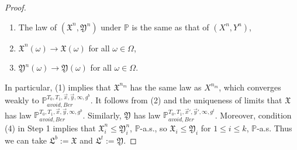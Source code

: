 \begin{proof}
\begin{enumerate}[label=(\arabic*)]
		\item The law of $(\mathfrak{X}^n,\mathfrak{Y}^n)$ under $\mathbb{P}$ is the same as that of $(X^n,Y^n)$,
		
		\item $\mathfrak{X}^n(\omega) \longrightarrow \mathfrak{X}(\omega)$ for all $\omega\in\Omega$,
		
		\item $\mathfrak{Y}^n(\omega) \longrightarrow \mathfrak{Y}(\omega)$ for all $\omega\in\Omega$.
		
	\end{enumerate}
	
	In particular, (1) implies that $\mathfrak{X}^{n_m}$ has the same law as $X^{n_m}$, which converges weakly to $\mathbb{P}_{avoid,Ber}^{T_0,T_1,\vec{x},\vec{y},\infty,g^b}$. It follows from (2) and the uniqueness of limits that $\mathfrak{X}$ has law $\mathbb{P}_{avoid,Ber}^{T_0,T_1,\vec{x},\vec{y},\infty,g^b}$. Similarly, $\mathfrak{Y}$ has law $\mathbb{P}_{avoid,Ber}^{T_0,T_1,\vec{x}',\vec{y}',\infty,g^t}$. Moreover, condition (4) in Step 1 implies that $\mathfrak{X}^n_i \leq \mathfrak{Y}^n_i$, $\mathbb{P}$-a.s., so $\mathfrak{X}_i \leq \mathfrak{Y}_i$ for $1\leq i\leq k$, $\mathbb{P}$-a.s. Thus we can take $\mathfrak{L}^b := \mathfrak{X}$ and $\mathfrak{L}^t := \mathfrak{Y}$.
	
\end{proof}